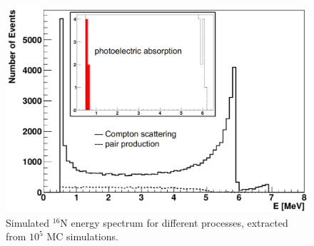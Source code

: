 \begin{figure}[htbp]
	\centering
	\includegraphics[width=12cm]{N16_MCenergySpectrum.png}
	\caption[Simulated $^{16}$N energy spectrum for different processes.]{Simulated $^{16}$N energy spectrum for different processes, extracted from $10^5$ MC simulations.}
	\label{N16nhitsSimu}
\end{figure}

